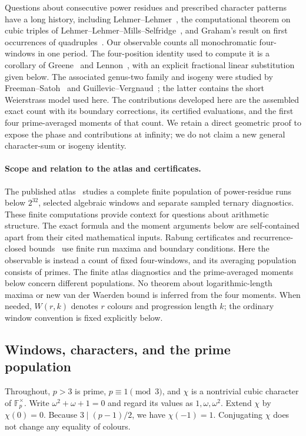 \documentclass[11pt]{article}
\theoremstyle{definition}\newtheorem{definition}[theorem]{Definition}
\newcommand{\Fp}{\mathbb F_p}
\begin{document}
Questions about consecutive power residues and prescribed character
patterns have a long history, including Lehmer--Lehmer~\cite{lehmer},
the computational theorem on cubic triples of
Lehmer--Lehmer--Mills--Selfridge~\cite{lehmermachine}, and Graham's
result on first occurrences of quadruples~\cite{graham}.
Our observable counts all monochromatic four-windows in one period.
The four-position identity used to compute it is a corollary of
Greene~\cite{greene} and Lennon~\cite{lennon}, with an explicit
fractional linear substitution given below. The associated genus-two
family and isogeny were studied by Freeman--Satoh~\cite{freemansatoh}
and Guillevic--Vergnaud~\cite{guillevicvergnaud}; the latter contains
the short Weierstrass model used here.
The contributions developed here are the assembled exact count with
its boundary corrections, its certified evaluations, and the first
four prime-averaged moments of that count. We retain a direct
geometric proof to expose the phase and contributions at infinity;
we do not claim a new general character-sum or isogeny identity.

\paragraph{Scope and relation to the atlas and certificates.}
The published atlas~\cite{atlas} studies a complete finite population of
power-residue runs below $2^{32}$, selected algebraic windows and separate
sampled ternary diagnostics. These finite computations provide context
for questions about arithmetic structure.
The exact formula and the moment arguments below are self-contained
apart from their cited mathematical inputs. Rabung certificates and
recurrence-closed bounds~\cite{bounds} use finite run maxima and boundary
conditions. Here the observable is instead a count of fixed four-windows,
and its averaging population consists of primes. The finite atlas diagnostics
and the prime-averaged moments below concern different populations. No theorem
about logarithmic-length maxima or new van der Waerden bound is inferred from
the four moments.
When needed, $W(r,k)$ denotes $r$ colours and progression length $k$;
the ordinary window convention is fixed explicitly below.

\subsection{Windows, characters, and the prime population}
Throughout, $p>3$ is prime, $p\equiv1\pmod3$, and $\chi$ is a
nontrivial cubic character of $\Fp^\times$. Write
$\omega^2+\omega+1=0$ and regard its values as
$1,\omega,\omega^2$. Extend $\chi$ by $\chi(0)=0$.
Because $3\mid(p-1)/2$, we have $\chi(-1)=1$.
Conjugating $\chi$ does not change any equality of colours.
\end{document}
